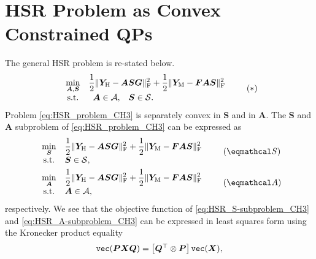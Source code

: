 \section{HSR Problem as Convex Constrained QPs}
The general HSR problem is re-stated below.
\begin{equation}
    \begin{array}{cl}
        \underset{\bm A,\bm S}{\min} &
        \displaystyle
        \frac{1}{2} \Vert \bm Y_\text H - \bm A \bm S \bm G \Vert_\text F^2 +
        \frac{1}{2} \Vert \bm Y_\text M - \bm F \bm A \bm S \Vert_\text F^2 \\
        \text{s.t.} &
        \begin{array}{cc}
            \bm A \in \mathcal A, & \bm S \in \mathcal S.
        \end{array}
    \end{array} \tag{$*$}
    \label{eq:HSR_problem_CH3}
\end{equation}
Problem \eqref{eq:HSR_problem_CH3} is separately convex in $\bm S$ and in
$\bm A$.
The $\bm S$ and $\bm A$ subproblem of \eqref{eq:HSR_problem_CH3} can be
expressed as
\begin{align}
    &
    \begin{array}{cl}
        \underset{\bm S}{\min} &
        \displaystyle
        \frac{1}{2} \Vert \YH - \bm A \bm S \bm G \Vert\Fr^2 +
        \frac{1}{2} \Vert \YM - \bm F \bm A \bm S \Vert\Fr^2 \\
        \text{s.t.} &
        \bm S \in \mathcal S,
    \end{array} \tag{$\eqmathcal S$}
    \label{eq:HSR_S-subproblem_CH3} \\
    &
    \begin{array}{cl}
        \underset{\bm A}{\min} &
        \displaystyle
        \frac{1}{2} \Vert \YH - \bm A \bm S \bm G \Vert\Fr^2 +
        \frac{1}{2} \Vert \YM - \bm F \bm A \bm S \Vert\Fr^2 \\
        \text{s.t.} &
        \bm A \in \mathcal A,
    \end{array} \tag{$\eqmathcal A$}
    \label{eq:HSR_A-subproblem_CH3}
\end{align}
respectively.
We see that the objective function of \eqref{eq:HSR_S-subproblem_CH3} and
\eqref{eq:HSR_A-subproblem_CH3} can be expressed in least squares form using
the Kronecker product equality
\begin{equation}
    \texttt{vec}{(\bm P \bm X \bm Q)} =
    \begin{bmatrix} \bm Q^\top \otimes \bm P \end{bmatrix} \texttt{vec}{(\bm X)},
\end{equation}
